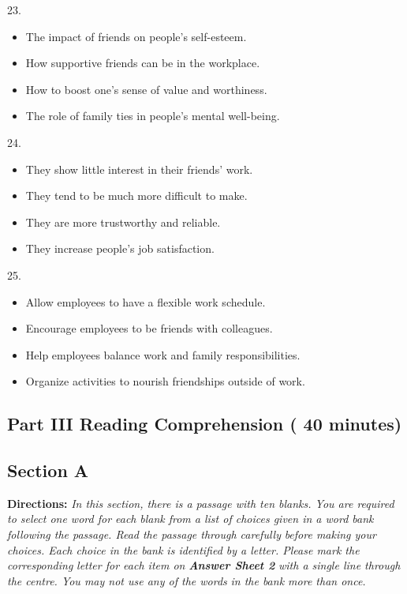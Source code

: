 \documentclass[UTF8,11pt]{ctexart}
\begin{document}
23.


\begin{itemize}[leftmargin=2em,itemsep=.2em,topsep=.4em]\item[A.] The impact of friends on people’s self-esteem.
\item[B.] How supportive friends can be in the workplace.
\item[C.] How to boost one’s sense of value and worthiness.
\item[D.] The role of family ties in people’s mental well-being.
\end{itemize}

24.


\begin{itemize}[leftmargin=2em,itemsep=.2em,topsep=.4em]\item[A.] They show little interest in their friends’ work.
\item[B.] They tend to be much more difficult to make.
\item[C.] They are more trustworthy and reliable.
\item[D.] They increase people’s job satisfaction.
\end{itemize}

25.


\begin{itemize}[leftmargin=2em,itemsep=.2em,topsep=.4em]\item[A.] Allow employees to have a flexible work schedule.
\item[B.] Encourage employees to be friends with colleagues.
\item[C.] Help employees balance work and family responsibilities.
\item[D.] Organize activities to nourish friendships outside of work.
\end{itemize}

\subsection*{\textbf{Part III Reading Comprehension ( 40 minutes)}}


\subsection*{\textbf{Section A}}


\textbf{Directions:} \textit{In this section, there is a passage with ten blanks. You are required to select one word for each} \textit{blank from a list of choices given in a word bank following the passage. Read the passage through carefully} \textit{before making your choices. Each choice in the bank is identified by a letter. Please mark the corresponding} \textit{letter for each item on }\textbf{\textit{Answer Sheet 2}}\textit{ with a single line through the centre. You may not use any of the words} \textit{in the bank more than once.}
\end{document}
